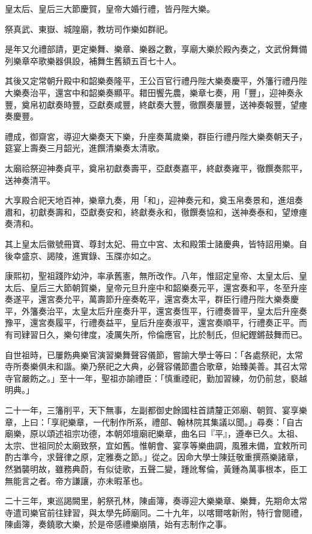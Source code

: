\begin{pinyinscope}
皇太后、皇后三大節慶賀，皇帝大婚行禮，皆丹陛大樂。

祭真武、東嶽、城隍廟，教坊司作樂如群祀。

是年又允禮部請，更定樂舞、樂章、樂器之數，享廟大樂於殿內奏之，文武佾舞備列樂章卒歌樂器俱設，補舞生舊額五百七十人。

其後又定常朝升殿中和韶樂奏隆平，王公百官行禮丹陛大樂奏慶平，外籓行禮丹陛大樂奏治平，還宮中和韶樂奏顯平。耤田饗先農，樂章七奏，用「豐」，迎神奏永豐，奠帛初獻奏時豐，亞獻奏咸豐，終獻奏大豐，徹饌奏屢豐，送神奏報豐，望瘞奏慶豐。

禮成，御齋宮，導迎大樂奏天下樂，升座奏萬歲樂，群臣行禮丹陛大樂奏朝天子，筵宴上壽奏三月韶光，進饌清樂奏太清歌。

太廟祫祭迎神奏貞平，奠帛初獻奏壽平，亞獻奏嘉平，終獻奏雍平，徹饌奏熙平，送神奏清平。

大享殿合祀天地百神，樂章九奏，用「和」，迎神奏元和，奠玉帛奏景和，進俎奏肅和，初獻奏壽和，亞獻奏安和，終獻奏永和，徹饌奏協和，送神奏泰和，望燎瘞奏清和。

其上皇太后徽號冊寶、尊封太妃、冊立中宮、太和殿策士諸慶典，皆特詔用樂。自後幸盛京、謁陵，進實錄、玉牒亦如之。

康熙初，聖祖踐阼幼沖，率承舊憲，無所改作。八年，惟詔定皇帝、太皇太后、皇太后、皇后三大節朝賀樂，皇帝元旦升座中和韶樂奏元平，還宮奏和平，冬至升座奏遂平，還宮奏允平，萬壽節升座奏乾平，還宮奏太平，群臣行禮丹陛大樂奏慶平，外籓奏治平，太皇太后升座奏升平，還宮奏恆平，行禮奏晉平，皇太后升座奏豫平，還宮奏履平，行禮奏益平，皇后升座奏淑平，還宮奏順平，行禮奏正平。而有司肄習日久，樂句律度，凌厲失所，伶倫應官，比於制氏，但紀鏗鏘鼓舞而已。

自世祖時，已屢飭典樂官演習樂舞聲容儀節，嘗諭大學士等曰：「各處祭祀，太常寺所奏樂俱未和諧。樂乃祭祀之大典，必聲容儀節盡合歌章，始臻美善。其召太常寺官嚴飭之。」至十一年，聖祖亦諭禮臣：「慎重禋祀，勤加習練，勿仍前怠，褻越明典。」

二十一年，三籓削平，天下無事，左副都御史餘國柱首請釐正郊廟、朝賀、宴享樂章，上曰：「享祀樂章，一代制作所系，禮部、翰林院其集議以聞。」尋奏：「自古廟樂，原以頌述祖宗功德，本朝郊壇廟祀樂章，曲名曰『平』，遵奉已久。太祖、太宗、世祖同於太廟致祭，宜如舊。惟朝會、宴享等樂曲調，風雅未備，宜敕所司酌古準今，求聲律之原，定雅奏之節。」從之。因命大學士陳廷敬重撰燕樂諸章，然猶襲明故，雖務典蔚，有似徒歌，五聲二變，踵訛奪倫，黃鍾為萬事根本，臣工無能言之者。帝方謙讓，亦未暇革也。

二十三年，東巡謁闕里，躬祭孔林，陳鹵簿，奏導迎大樂樂章、樂舞，先期命太常寺遣司樂官前往肄習，與太學先師廟同。二十九年，以喀爾喀新附，特行會閱禮，陳鹵簿，奏鐃歌大樂，於是帝感禮樂崩隤，始有志制作之事。


\end{pinyinscope}
